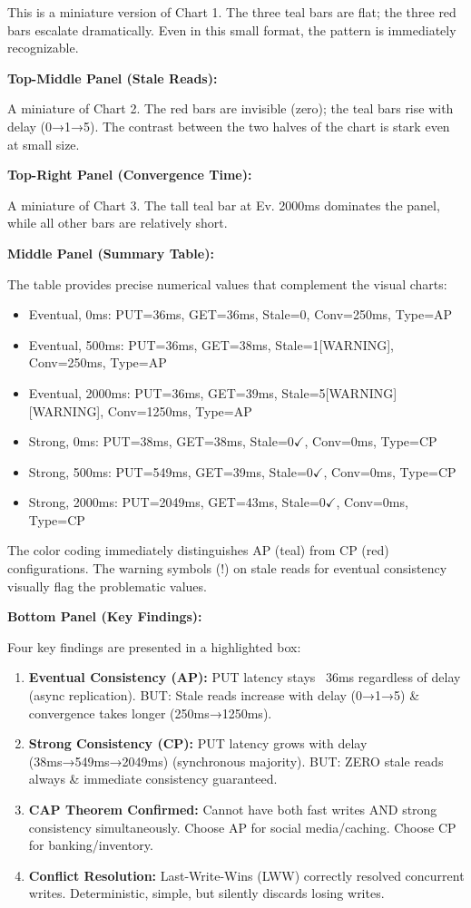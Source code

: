 \documentclass[10pt,a4paper]{article}
\begin{document}
This is a miniature version of Chart 1. The three teal bars are flat; the three red bars escalate dramatically. Even in this small format, the pattern is immediately recognizable.

\textbf{Top-Middle Panel (Stale Reads):}

A miniature of Chart 2. The red bars are invisible (zero); the teal bars rise with delay (0→1→5). The contrast between the two halves of the chart is stark even at small size.

\textbf{Top-Right Panel (Convergence Time):}

A miniature of Chart 3. The tall teal bar at Ev. 2000ms dominates the panel, while all other bars are relatively short.

\textbf{Middle Panel (Summary Table):}

The table provides precise numerical values that complement the visual charts:
\begin{itemize}
    \item Eventual, 0ms: PUT=36ms, GET=36ms, Stale=0, Conv=250ms, Type=AP
    \item Eventual, 500ms: PUT=36ms, GET=38ms, Stale=1[WARNING], Conv=250ms, Type=AP
    \item Eventual, 2000ms: PUT=36ms, GET=39ms, Stale=5[WARNING][WARNING], Conv=1250ms, Type=AP
    \item Strong, 0ms: PUT=38ms, GET=38ms, Stale=0$\checkmark$, Conv=0ms, Type=CP
    \item Strong, 500ms: PUT=549ms, GET=39ms, Stale=0$\checkmark$, Conv=0ms, Type=CP
    \item Strong, 2000ms: PUT=2049ms, GET=43ms, Stale=0$\checkmark$, Conv=0ms, Type=CP
\end{itemize}

The color coding immediately distinguishes AP (teal) from CP (red) configurations. The warning symbols (!) on stale reads for eventual consistency visually flag the problematic values.

\textbf{Bottom Panel (Key Findings):}

Four key findings are presented in a highlighted box:

\begin{enumerate}
    \item \textbf{Eventual Consistency (AP):} PUT latency stays ~36ms regardless of delay (async replication). BUT: Stale reads increase with delay (0→1→5) \& convergence takes longer (250ms→1250ms).
    
    \item \textbf{Strong Consistency (CP):} PUT latency grows with delay (38ms→549ms→2049ms) (synchronous majority). BUT: ZERO stale reads always \& immediate consistency guaranteed.
    
    \item \textbf{CAP Theorem Confirmed:} Cannot have both fast writes AND strong consistency simultaneously. Choose AP for social media/caching. Choose CP for banking/inventory.
    
    \item \textbf{Conflict Resolution:} Last-Write-Wins (LWW) correctly resolved concurrent writes. Deterministic, simple, but silently discards losing writes.
\end{enumerate}
\end{document}
